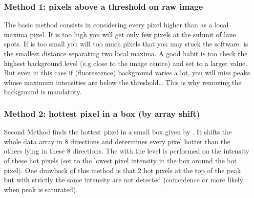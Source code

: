 \documentclass[letterpaper,10pt,english]{sphinxmanual}
\begin{document}
\subsubsection{Method 1: pixels above a threshold on raw image}
\label{\detokenize{PeakSearchGUI:method-1-pixels-above-a-threshold-on-raw-image}}
The basic method consists in considering every pixel higher than  as a local maxima pixel.
If  is too high you will get only few pixels at the submit of laue spots.
If  is too small you will too much pixels that you may stuck the software.
 is the smallest distance separating two local maxima.
A good habit is too check the highest background level (e.g close to the image centre) and set  to a larger value. But even in this case if (fluorescence) background varies a lot, you will miss peaks whose maximum intensities are below the threshold… This is why removing the background is mandatory.

\noindent{}


\subsubsection{Method 2: hottest pixel in a box (by array shift)}
\label{\detokenize{PeakSearchGUI:method-2-hottest-pixel-in-a-box-by-array-shift}}
Second Method finds the hottest pixel in a small box given by . It shifts the whole data array in 8 directions and determines every pixel hotter than the others lying in these 8 directions.
The  with the  level is performed on the intensity of these hot pixels  (set to the lowest pixel intensity in the box around the hot pixel).
One drawback of this method is that 2 hot pixels at the top of the peak but with strictly the same intensity are not detected (coincidence or more likely when peak is saturated).

\noindent{}
\end{document}
